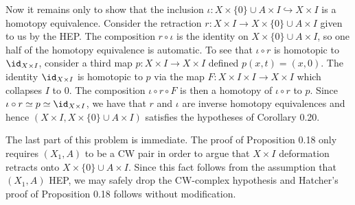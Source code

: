 \begin{homework}[e]
\begin{prf}
		Now it remains only to show that the inclusion $\iota:X\times \{0\}\cup A\times I \hookrightarrow X\times I$ is a homotopy equivalence. Consider the retraction $r:X\times I \to X\times \{0\}\cup A\times I$ given to us by the HEP. The composition $r\circ \iota$ is the identity on $X\times \{0\}\cup A\times I$, so one half of the homotopy equivalence is automatic. To see that $\iota\circ r$ is homotopic to $\id_{X\times I}$, consider a third map $p:X\times I \to X\times I$ defined $p(x,t) = (x,0)$. The identity $\id_{X\times I}$ is homotopic to $p$ via the map $F:X\times I \times I \to X\times I$ which collapses $I$ to $0$. The composition $\iota\circ r \circ F$ is then a homotopy of $\iota\circ r$ to $p$. Since $\iota \circ r \simeq p \simeq \id_{X\times I}$, we have that $r$ and $\iota$ are inverse homotopy equivalences and hence $(X\times I,X\times \{0\} \cup A\times I)$ satisfies the hypotheses of Corollary 0.20.

		\bigskip

		The last part of this problem is immediate. The proof of Proposition 0.18 only requires $(X_1,A)$ to be a CW pair in order to argue that $X\times I$ deformation retracts onto $X\times \{0\}\cup A\times I$. Since this fact follows from the assumption that $(X_1,A)$ HEP, we may safely drop the CW-complex hypothesis and Hatcher's proof of Proposition 0.18 follows without modification.
	\end{prf}
\end{homework}

